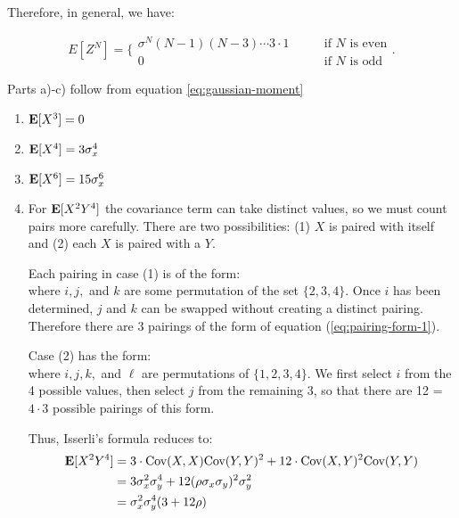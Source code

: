 \documentclass{homework}
\begin{document}
\begin{enumerate}[label=\roman*)]
Therefore, in general, we have:


\begin{equation}
    E[Z^N] = \biggl\{
        \begin{array}{ll}
            \sigma^N (N-1)(N-3) \cdots 3 \cdot 1 &\qquad \text{if $N$ is even} \\
            0 &\qquad \text{if $N$ is odd}
        \end{array}
    \biggr.
    \label{eq:gaussian-moment}
\end{equation}

Parts a)-c) follow from equation \ref{eq:gaussian-moment}
    \begin{enumerate}[label=\alph*)]
        \item ${\bf E}[X^3] = 0$
        \item ${\bf E}[X^4] = 3 \sigma_x^4$
        \item ${\bf E}[X^6] = 15 \sigma_x^6$
        \item For ${\bf E}[X^2 Y^4]$ the covariance term can take distinct values,
            so we must count pairs more carefully. There are two possibilities:
            (1) $X$ is paired with itself and (2) each $X$ is paired with a $Y$.

            Each pairing in case (1) is of the form:
            \begin{equation}
                [ \{X_1, X_2\}, \{Y_1, Y_i\}, \{Y_j, Y_k\}]
                \label{eq:pairing-form-1}
            \end{equation}
            where $i,j,$ and $k$ are some permutation of the set $\{2,3,4\}$.
            Once $i$ has been determined, $j$ and $k$ can be swapped without
            creating a distinct pairing. Therefore there are 3 pairings
            of the form of equation (\ref{eq:pairing-form-1}).

            Case (2) has the form:
            \begin{equation}
                [\{X_1, Y_i\}, \{X_2, Y_j\}, \{Y_k, Y_\ell\}]
            \end{equation}
            where $i,j,k,$ and $\ell$ are permutations of $\{1,2,3,4\}$.
            We first select $i$ from the 4 possible values, then select $j$
            from the remaining 3, so that there are 12 = $4\cdot3$ possible
            pairings of this form.

            Thus, Isserli's formula reduces to:
            \begin{align*}
                {\bf E}[X^2Y^4] &= 3 \cdot \text{Cov}(X, X) \text{Cov}(Y, Y)^2
                    + 12 \cdot \text{Cov}(X, Y)^2 \text{Cov}(Y,Y) \\
                    &= 3 \sigma_x^2 \sigma_y^4 + 12 (\rho \sigma_x \sigma_y)^2 \sigma_y^2 \\
                    &= \sigma_x^2 \sigma_y^4 ( 3 + 12 \rho)
            \end{align*}

    \end{enumerate}

\end{enumerate}
\end{document}
